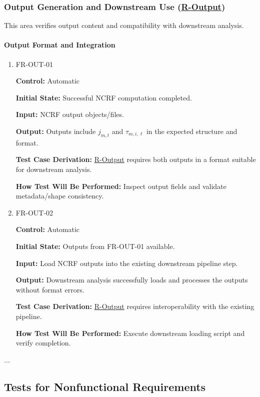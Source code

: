 \documentclass[12pt, titlepage]{article}
\begin{document}
\subsubsection{Output Generation and Downstream Use (\hyperref[R-Output]{R-Output})}
This area verifies output content and compatibility with downstream analysis.

\paragraph{Output Format and Integration}

\begin{enumerate}

\item{FR-OUT-01\\}

\textbf{Control:} Automatic

\textbf{Initial State:} Successful NCRF computation completed.

\textbf{Input:} NCRF output objects/files.

\textbf{Output:} Outputs include $j_{m,t}$ and $\tau_{m,i,\ell}$ in the expected structure and format.

\textbf{Test Case Derivation:} \hyperref[R-Output]{R-Output} requires both outputs in a format suitable for downstream analysis.

\textbf{How Test Will Be Performed:} Inspect output fields and validate metadata/shape consistency.

\item{FR-OUT-02\\}

\textbf{Control:} Automatic

\textbf{Initial State:} Outputs from FR-OUT-01 available.

\textbf{Input:} Load NCRF outputs into the existing downstream pipeline step.

\textbf{Output:} Downstream analysis successfully loads and processes the outputs without format errors.

\textbf{Test Case Derivation:} \hyperref[R-Output]{R-Output} requires interoperability with the existing pipeline.

\textbf{How Test Will Be Performed:} Execute downstream loading script and verify completion.

\end{enumerate}

...

\subsection{Tests for Nonfunctional Requirements}
\end{document}
